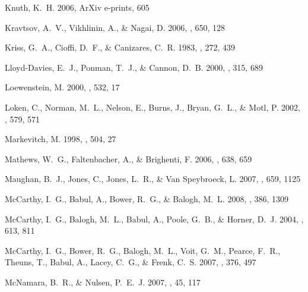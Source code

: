 \documentclass[12pt,preprint]{aastex}
\begin{document}
\begin{thebibliography}{138}
{Knuth}, K.~H. 2006, ArXiv e-prints, 605

{Kravtsov}, A.~V., {Vikhlinin}, A., \& {Nagai}, D. 2006, \apj, 650, 128

{Kriss}, G.~A., {Cioffi}, D.~F., \& {Canizares}, C.~R. 1983, \apj, 272, 439

{Lloyd-Davies}, E.~J., {Ponman}, T.~J., \& {Cannon}, D.~B. 2000, \mnras, 315,
  689

{Loewenstein}, M. 2000, \apj, 532, 17

{Loken}, C., {Norman}, M.~L., {Nelson}, E., {Burns}, J., {Bryan}, G.~L., \&
  {Motl}, P. 2002, \apj, 579, 571

{Markevitch}, M. 1998, \apj, 504, 27

{Mathews}, W.~G., {Faltenbacher}, A., \& {Brighenti}, F. 2006, \apj, 638, 659

{Maughan}, B.~J., {Jones}, C., {Jones}, L.~R., \& {Van Speybroeck}, L. 2007,
  \apj, 659, 1125

{McCarthy}, I.~G., {Babul}, A., {Bower}, R.~G., \& {Balogh}, M.~L. 2008,
  \mnras, 386, 1309

{McCarthy}, I.~G., {Balogh}, M.~L., {Babul}, A., {Poole}, G.~B., \& {Horner},
  D.~J. 2004, \apj, 613, 811

{McCarthy}, I.~G., {Bower}, R.~G., {Balogh}, M.~L., {Voit}, G.~M., {Pearce},
  F.~R., {Theuns}, T., {Babul}, A., {Lacey}, C.~G., \& {Frenk}, C.~S. 2007,
  \mnras, 376, 497

{McNamara}, B.~R., \& {Nulsen}, P.~E.~J. 2007, \araa, 45, 117


\end{thebibliography}
\end{document}

